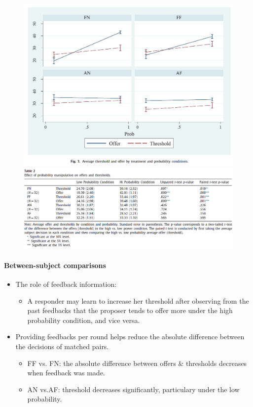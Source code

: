 \documentclass[../root]{subfiles}
\begin{document}
    \begin{figure}[ht]
        \centering
        \includegraphics[scale = .8]{1106tanji/F3}
        \includegraphics[scale = .8]{1106tanji/T2}
    \end{figure}

    \paragraph{Between-subject comparisons}

    \begin{itemize}
      \item The role of feedback information:
      \begin{itemize}
        \item A responder may learn to increase her threshold after observing from the past feedbacks that the proposer tends to offer more under the high probability condition, and vice versa.
      \end{itemize}
      \item Providing feedbacks per round helps reduce the absolute difference between the decisions of matched pairs.
      \begin{itemize}
        \item FF vs. FN: the absolute difference between offers \& thresholds decreases when feedback was made.
        \item AN vs.AF: threshold decreases significantly, particulary under the low probability.
      \end{itemize}
    \end{itemize}
\end{document}

